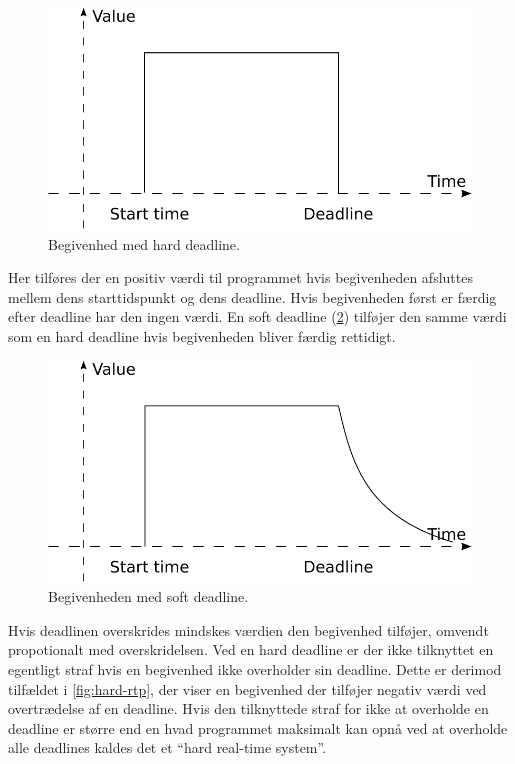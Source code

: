 \begin{figure}
 \begin{center}
  \includegraphics[scale=0.75]{images/hard-deadline}
	\caption{Begivenhed med hard deadline.}
	\label{fig:hard-dl}
\end{center}
\end{figure}
Her tilføres der en positiv værdi til programmet hvis begivenheden afsluttes mellem dens starttidspunkt og dens deadline. Hvis begivenheden først er færdig efter deadline har den ingen værdi. En soft deadline (\cref{figure:soft-dl}) tilføjer den samme værdi som en hard deadline hvis begivenheden bliver færdig rettidigt. 
\begin{figure}
 \begin{center}
  \includegraphics[scale=0.75]{images/soft-deadline}
	\caption{Begivenheden med soft deadline.}
	\label{figure:soft-dl}
\end{center}
\end{figure}
Hvis deadlinen overskrides mindskes værdien den begivenhed tilføjer, omvendt propotionalt med overskridelsen. Ved en hard deadline er der ikke tilknyttet en egentligt straf hvis en begivenhed ikke overholder sin deadline. Dette er derimod tilfældet i \cref{fig:hard-rtp}, der viser en begivenhed der tilføjer negativ værdi ved overtrædelse af en deadline. Hvis den tilknyttede straf for ikke at overholde en deadline er større end en hvad programmet maksimalt kan opnå ved at overholde alle deadlines kaldes det et ``hard real-time system''\cite{Laprie1989}.
